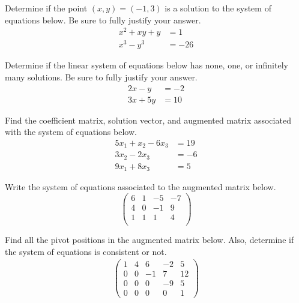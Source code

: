 \documentclass[11pt,letterpaper]{article}
\begin{document}

 Determine if the point $(x, y)= (-1, 3)$ is a solution to the system of equations below. Be sure to fully justify your answer.
	\[
	\begin{aligned}
	x^2 + xy + y&= 1 \\
	x^3 - y^3&= -26
	\end{aligned}
	\]



\newpage



 Determine if the linear system of equations below has none, one, or infinitely many solutions. Be sure to fully justify your answer. 
	\[
	\begin{aligned}
	2x - y&= -2 \\
	3x + 5y&= 10
	\end{aligned}
	\]



\newpage



 Find the coefficient matrix, solution vector, and augmented matrix associated with the system of equations below. 
	\[
	\begin{aligned}
	5x_1 + x_2 - 6x_3&= 19 \\
	3x_2 - 2x_3&= -6 \\
	9x_1 + 8x_3&= 5
	\end{aligned}
	\]



\newpage



 Write the system of equations associated to the augmented matrix below. 
	\[
	\begin{pmatrix}
	6 & 1 & -5 & -7 \\
	4 & 0 & -1 & 9 \\
	1 & 1 & 1 & 4 \\
	\end{pmatrix}
	\]



\newpage



 Find all the pivot positions in the augmented matrix below. Also, determine if the system of equations is consistent or not. 
	\[
	\begin{aligned}
	\begin{pmatrix}
	1 & 4 & 6 & -2 & 5 \\
	0 & 0 & -1 & 7 & 12 \\
	0 & 0 & 0 & -9 & 5 \\
	0 & 0 & 0 & 0 & 1
	\end{pmatrix}
	\end{aligned}
	\]
\end{document}
